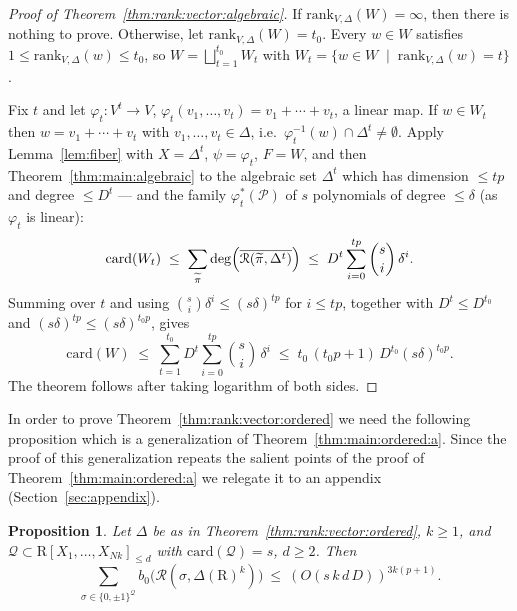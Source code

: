 \documentclass[10pt]{amsart}
\newtheorem{proposition}{Proposition}[section]
\theoremstyle{definition}
\theoremstyle{remark}
\numberwithin{equation}{section}
\newcommand {\R} {\mathrm{R}}
\newcommand {\RR} {{\mathcal R}}
\newcommand{\card}{\mathrm{card}}
\newcommand{\rank}{\mathrm{rank}}
\begin{document}
\begin{proof}[Proof of Theorem~\ref{thm:rank:vector:algebraic}]
If $\rank_{V,\Delta}(W) = \infty $, then there is nothing to prove. Otherwise, let
$\rank_{V,\Delta}(W) = t_0$.
Every $w \in W$ satisfies $1 \le \mathrm{rank}_{V,\Delta}(w) \le t_0$, so
$W = \bigsqcup_{t=1}^{t_0} W_t$ with
$W_t = \{w \in W \;\mid\; \mathrm{rank}_{V,\Delta}(w) = t\}$.

Fix $t$ and let $\varphi_t\colon V^t \to V$,
$\varphi_t(v_1,\dots,v_t) = v_1 + \cdots + v_t$, a linear map. If $w \in
W_t$ then $w = v_1 + \cdots + v_t$ with $v_1,\dots,v_t \in \Delta$, i.e.\
$\varphi_t^{-1}(w) \cap \Delta^t \neq \emptyset$. Apply
Lemma~\ref{lem:fiber} with $X = \Delta^t$, $\psi = \varphi_t$, $F = W$, and
then Theorem~\ref{thm:main:algebraic} to the algebraic set $\Delta^t$
which has dimension $\le tp$ and degree $\le D^t$ --- and the
family $\varphi_t^*(\mathcal{P})$ of $s$ polynomials of degree $\le \delta$ (as
$\varphi_t$ is linear):
\[
\card(W_t)
\;\le\;
\sum_{\widetilde\pi}
\deg\Bigl(\overline{\RR(\widetilde\pi, \Delta^t)}\Bigr)
\;\le\;
D^t \sum_{i=0}^{tp} \binom{s}{i}\,\delta^i.
\]
Summing over $t$ and using $\binom{s}{i}\delta^i \le (s\delta)^{tp}$ for
$i \le tp$, together with $D^t \le D^{t_0}$ and
$(s\delta)^{tp} \le (s\delta)^{t_0 p}$, gives 
\[
\card(W)
\;\le\;
\sum_{t=1}^{t_0} D^t \sum_{i=0}^{tp} \binom{s}{i}\,\delta^i
\;\le\;
t_0\,(t_0 p + 1)\, D^{t_0} (s\delta)^{t_0 p}.
\]
The theorem follows after taking logarithm of both sides.
\end{proof}

In order to prove Theorem~\ref{thm:rank:vector:ordered} we need the following proposition which is a generalization of Theorem~\ref{thm:main:ordered:a}. Since the proof of this generalization repeats the salient points of the proof of Theorem~\ref{thm:main:ordered:a} we relegate it to an appendix (Section~\ref{sec:appendix}).


\begin{proposition}
\label{prop:A}
Let $\Delta$ be as in Theorem~\ref{thm:rank:vector:ordered}, $k\ge 1$, and $\mathcal{Q} \subset\R[X_1,\dots,X_{Nk}]_{\le d}$ with $\card(\mathcal{Q}) =s$, $d \geq 2$. Then
\[
\sum_{\sigma\in\{0,\pm1\}^{\mathcal{Q}}} b_0\bigl(\RR(\sigma,\Delta(\R)^k)\bigr)\ \le\ (O(s\,k\,d\,D))^{3k(p+1)}.
\]
\end{proposition}
\end{document}
